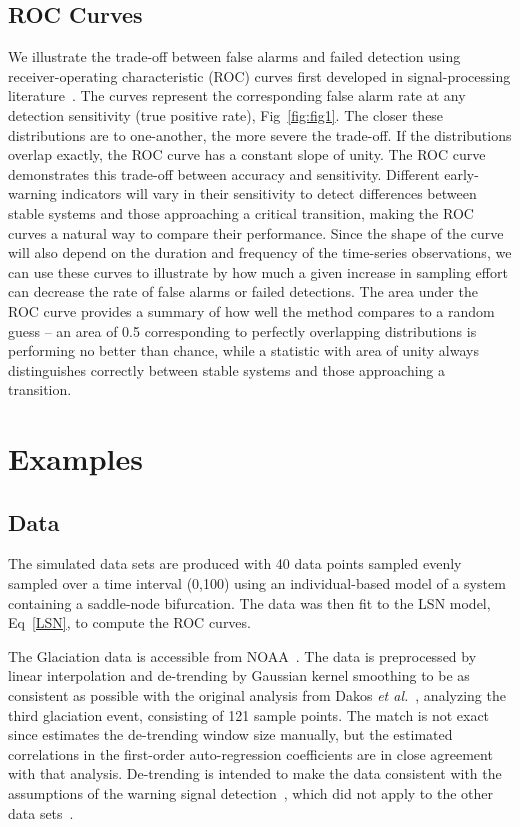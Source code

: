 \documentclass[authoryear,preprint,11pt]{elsarticle}
\begin{document}
\subsection{ROC Curves}
We illustrate the trade-off between false alarms and failed detection using 
receiver-operating characteristic (ROC) curves first developed in signal-processing literature~\citep{Green1989, Keller2009}⁠. 
The curves represent the corresponding false alarm rate at any detection sensitivity (true positive rate), Fig~\ref{fig:fig1}.
The closer these distributions are to one-another, the more severe the trade-off.  
If the distributions overlap exactly, the ROC curve has a constant slope of unity.  
The ROC curve demonstrates this trade-off between accuracy and sensitivity.  
Different early-warning indicators will vary in their sensitivity to detect differences
between stable systems and those approaching a critical transition,
making the ROC curves a natural way to compare their performance.  
Since the shape of the curve will also depend on the duration and frequency of the time-series observations,
we can use these curves to illustrate by how much a given increase in sampling effort can decrease the rate of false alarms or failed detections.  
The area under the ROC curve provides a summary of how well the method compares to a random guess --
an area of 0.5 corresponding to perfectly overlapping distributions is performing no better than chance,
while a statistic with area of unity always distinguishes correctly between stable systems and those approaching a transition. 



\section{Examples}

\subsection*{Data}
The simulated data sets are produced with 40 data points
sampled evenly sampled over a time interval (0,100) using an individual-based model of a system containing a saddle-node bifurcation. 
The data was then fit to the LSN model, Eq~\eqref{LSN}, to compute the ROC curves. 

The Glaciation data is accessible from NOAA~\citep{Petit1999}.
The data is preprocessed by linear interpolation and de-trending by Gaussian kernel smoothing 
to be as consistent as possible with the original analysis from Dakos \emph{et al.}~\citep{Dakos2008},
analyzing the third glaciation event, consisting of 121 sample points. 
The match is not exact since estimates the de-trending window size manually,
but the estimated correlations in the first-order auto-regression coefficients are in close agreement with that analysis. 
De-trending is intended to make the data consistent with the assumptions of the warning signal detection~\citep{Dakos2008}, 
which did not apply to the other data sets~\citep{Drake2010}.  
\end{document}
